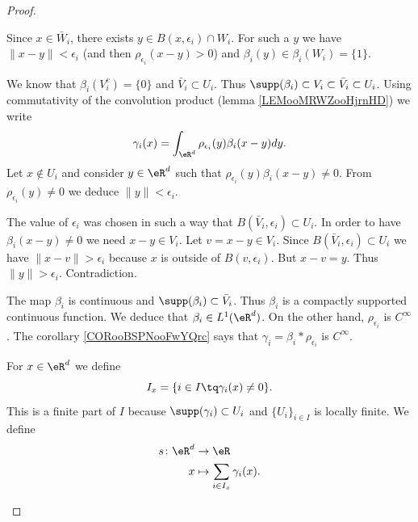\begin{proof}
\begin{subproof}
\begin{subproof}
			Since \( x\in \bar W_i\), there exists \( y\in B(x,\epsilon_i)\cap W_i\). For such a \( y\) we have \( \| x-y \|<\epsilon_i\) (and then \( \rho_{\epsilon_i}(x-y)>0\)) and \( \beta_i(y)\in \beta_i(W_i)=\{ 1 \}\).

			We know that \( \beta_i(V_i^c)=\{ 0 \}\) and \( \bar V_i\subset U_i\). Thus \( \supp(\beta_i)\subset V_i\subset\bar V_i\subset U_i\). Using commutativity of the convolution product (lemma \ref{LEMooMRWZooHjrnHD}) we write
			\begin{equation}
				\gamma_i(x)=\int_{\eR^d}\rho_{\epsilon_i}(y)\beta_i(x-y)dy.
			\end{equation}
			Let \( x\not\in U_i\) and consider \( y\in \eR^d\) such that \( \rho_{\epsilon_i}(y)\beta_i(x-y)\neq 0\). From \( \rho_{\epsilon_i}(y)\neq 0\) we deduce \( \| y \|<\epsilon_i\).

			The value of \( \epsilon_i\) was chosen in such a way that \( B(\bar V_i,\epsilon_i)\subset U_i\). In order to have \( \beta_i(x-y)\neq 0\) we need \( x-y\in V_i\). Let \( v=x-y\in V_i\). Since \( B(\bar V_i,\epsilon_i)\subset U_i\) we have \( \| x-v \|>\epsilon_i\) because \( x\) is outside of \( B(v,\epsilon_i)\). But \( x-v=y\). Thus \( \| y \|>\epsilon_i\). Contradiction.

			The map \( \beta_i\) is continuous and \( \supp(\beta_i)\subset \bar V_i\). Thus \( \beta_i\) is a compactly supported continuous function. We deduce that \( \beta_i\in L^1(\eR^d)\). On the other hand, \( \rho_{\epsilon_i}\) is \( C^{\infty}\). The corollary \ref{CORooBSPNooFwYQrc} says that \( \gamma_i=\beta_i*\rho_{\epsilon_i}\) is \( C^{\infty}\).

			For \( x\in \eR^d\) we define
			\begin{equation}
				I_x=\{ i\in I\tq \gamma_i(x)\neq 0 \}.
			\end{equation}
			This is a finite part of \( I\) because \( \supp(\gamma_i)\subset U_i\) and \( \{ U_i \}_{i\in I}\) is locally finite. We define
			\begin{equation}
				\begin{aligned}
					s\colon \eR^d & \to \eR                             \\
					x             & \mapsto \sum_{i\in I_x}\gamma_i(x).
				\end{aligned}
			\end{equation}


\end{subproof}
\end{subproof}
\end{proof}
